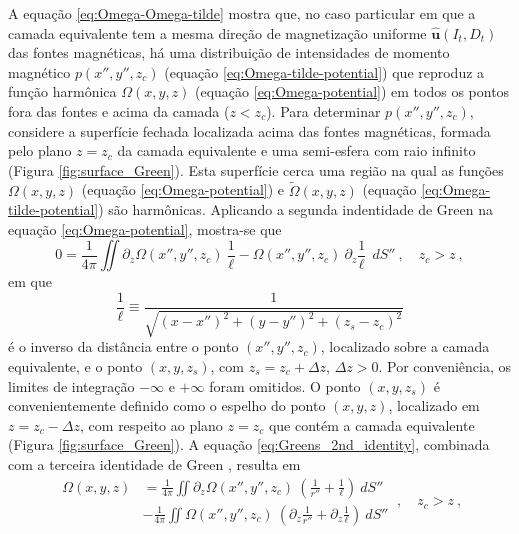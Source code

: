 A equação \ref{eq:Omega-Omega-tilde} mostra que, 
no caso particular em que a camada equivalente tem a mesma direção de magnetização 
uniforme $\hat{\mathbf{u}}(I_{t}, D_{t})$ das fontes magnéticas, 
há uma distribuição de intensidades de momento magnético $p(x'', y'', z_{c})$ 
(equação \ref{eq:Omega-tilde-potential}) que reproduz a função harmônica $\Omega(x, y, z)$ 
(equação \ref{eq:Omega-potential}) em todos os pontos fora das 
fontes e acima da camada ($z < z_{c}$). 
Para determinar $p(x'', y'', z_{c})$, considere a superfície fechada localizada acima das fontes 
magnéticas, formada pelo plano $z = z_{c}$ da camada equivalente e uma semi-esfera com raio infinito 
(Figura \ref{fig:surface_Green}). Esta superfície cerca uma região na qual as funções  $\Omega(x, y, z)$ 
(equação \ref{eq:Omega-potential}) e $\tilde{\Omega}(x, y, z)$ (equação \ref{eq:Omega-tilde-potential})
são harmônicas. Aplicando a segunda indentidade de Green \citep[][ p. 215]{kellogg1967} na 
equação \ref{eq:Omega-potential}, mostra-se que 
\begin{equation}
0 = \frac{1}{4\pi}
\iint
\partial_{z} \Omega(x'', y'', z_{c}) \: \frac{1}{\ell} - 
\Omega(x'', y'', z_{c}) \: \partial_{z} \frac{1}{\ell}
\:\: dS'' \: , \quad z_{c} > z \: ,
\label{eq:Greens_2nd_identity}
\end{equation}
em que 
\begin{equation}
\frac{1}{\ell} \equiv \frac{1}{\sqrt{(x - x'')^{2} +
		(y - y'')^{2} +
		(z_{s} - z_{c})^{2}}}
\label{eq:inv-l}
\end{equation}
é o inverso da distância entre o ponto $(x'', y'', z_{c})$, localizado sobre a camada equivalente, 
e o ponto $(x, y, z_{s})$, com $z_{s} = z_{c} + \Delta z$, $\Delta z > 0$. 
Por conveniência, os limites de integração $-\infty$ e $+\infty$ foram omitidos. 
O ponto $(x, y, z_{s})$ é convenientemente definido como o espelho do ponto $(x, y, z)$, 
localizado em $z = z_{c} - \Delta z$, com respeito ao plano $z = z_{c}$ que contém a camada 
equivalente (Figura \ref{fig:surface_Green}). A equação \ref{eq:Greens_2nd_identity}, combinada com 
a terceira identidade de Green \citep[][ p. 219]{kellogg1967}, resulta em
\begin{equation}
\begin{split} 
\Omega(x, y, z) &= \frac{1}{4\pi} \iint
\partial_{z} \Omega(x'', y'', z_{c}) \: 
\left( \frac{1}{r''} + \frac{1}{\ell} \right) \: dS'' \\
&- \frac{1}{4\pi} \iint \Omega(x'', y'', z_{c}) \: 
\left( \partial_{z} \frac{1}{r''} + \partial_{z} \frac{1}{\ell} \right)
\: dS''
\end{split} \: , \quad z_{c} > z \: ,
\label{eq:Greens_3rd_identity}
\end{equation}

